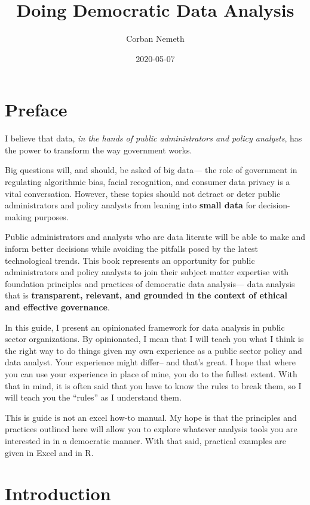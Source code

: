 \documentclass[]{book}
\title{Doing Democratic Data Analysis}
\author{Corban Nemeth}
\date{2020-05-07}
\begin{document}
\maketitle

{
\setcounter{tocdepth}{1}
\tableofcontents
}
\hypertarget{preface}{%
\chapter*{Preface}\label{preface}}

I believe that data, \emph{in the hands of public administrators and policy analysts}, has the power to transform the way government works.

Big questions will, and should, be asked of big data--- the role of government in regulating algorithmic bias, facial recognition, and consumer data privacy is a vital conversation. However, these topics should not detract or deter public administrators and policy analysts from leaning into \textbf{small data} for decision-making purposes.

Public administrators and analysts who are data literate will be able to make and inform better decisions while avoiding the pitfalls posed by the latest technological trends. This book represents an opportunity for public administrators and policy analysts to join their subject matter expertise with foundation principles and practices of democratic data analysis--- data analysis that is \textbf{transparent, relevant, and grounded in the context of ethical and effective governance}.

In this guide, I present an opinionated framework for data analysis in public sector organizations. By opinionated, I mean that I will teach you what I think is the right way to do things given my own experience as a public sector policy and data analyst. Your experience might differ-- and that's great. I hope that where you can use your experience in place of mine, you do to the fullest extent. With that in mind, it is often said that you have to know the rules to break them, so I will teach you the ``rules'' as I understand them.

This is guide is not an excel how-to manual. My hope is that the principles and practices outlined here will allow you to explore whatever analysis tools you are interested in in a democratic manner. With that said, practical examples are given in Excel and in R.

\hypertarget{intro}{%
\chapter{Introduction}\label{intro}}
\end{document}
